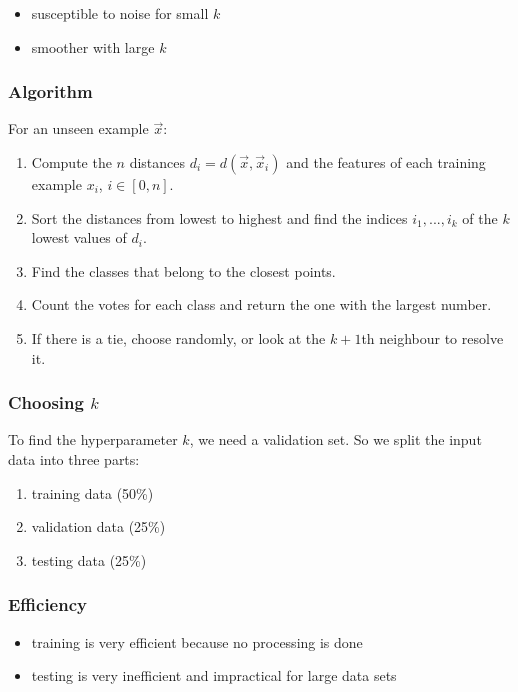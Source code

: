 \documentclass{article}
\begin{document}
\begin{itemize}
	\item susceptible to noise for small $k$
	\item smoother with large $k$
\end{itemize}

\subsubsection{Algorithm}

For an unseen example $\vec x$:
\begin{enumerate}
	\item Compute the $n$ distances $d_i=d(\vec x, \vec x_i)$ and the features
	      of each training example $x_i$, $i\in[0,n]$.
	\item Sort the distances from lowest to highest and find the indices $i_1,...,i_k$ of the $k$ lowest values of $d_i$.
	\item Find the classes that belong to the closest points.
	\item Count the votes for each class and return the one with the largest number.
	\item If there is a tie, choose randomly, or look at the $k+1$th neighbour to resolve it.
\end{enumerate}

\subsubsection{Choosing $k$}

To find the hyperparameter $k$, we need a validation set. So we split
the input data into three parts:
\begin{enumerate}
	\item training data (50\%)
	\item validation data (25\%)
	\item testing data (25\%)
\end{enumerate}

\subsubsection{Efficiency}
\begin{itemize}
	\item training is very efficient because no processing is done
	\item testing is very inefficient and impractical for large data sets
\end{itemize}
\end{document}
